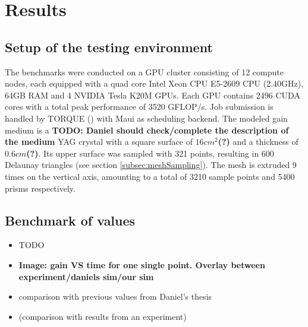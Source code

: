 \section{Results}

\subsection{Setup of the testing environment}

The benchmarks were conducted on a GPU cluster consisting of 12 compute nodes,
each equipped with a quad core Intel Xeon CPU E5-2609 CPU (2.40GHz), 64GB RAM
and 4 NVIDIA Tesla K20M GPUs. Each GPU contains 2496 CUDA cores with a total
peak performance of 3520 GFLOP/s. Job submission is handled by TORQUE
(\cite{torque}) with Maui as scheduling backend. The modeled gain medium is a
\textbf{TODO: Daniel should check/complete the description of the medium} YAG
crystal with a square surface of $16cm^2$\textbf{(?)} and a thickness of
$0.6cm$\textbf{(?)}. Its upper surface was sampled with 321 points, resulting in
600 Delaunay triangles (see section \ref{subsec:meshSampling}). The mesh is
extruded 9 times on the vertical axis, amounting to a total of 3210 sample
points and 5400 prisms respectively.

\subsection{Benchmark of values}

\begin{itemize}

  \item TODO

  \item \textbf{Image: gain VS time for one single point. Overlay between
    experiment/daniels sim/our sim}

  \item comparison with previous values from Daniel's thesis

  \item (comparison with results from an experiment)

\end{itemize}



